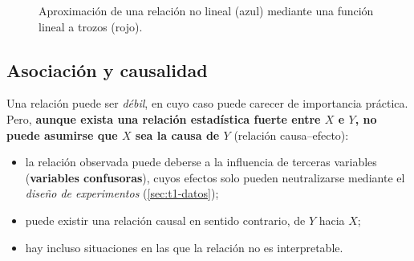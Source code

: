 \begin{figure}[H]
  \centering
  \caption{Aproximación de una relación no lineal (azul) mediante una función lineal a
    trozos (rojo).}
\end{figure}

\subsection{Asociación y causalidad}
\label{sec:t1-causalidad}

Una relación puede ser \emph{débil}, en cuyo caso puede carecer de importancia práctica. Pero,
\textbf{aunque exista una relación estadística fuerte entre $X$ e $Y$, no puede asumirse que
$X$ sea la causa de $Y$} (relación causa--efecto):
\begin{itemize}
  \item la relación observada puede deberse a la influencia de terceras variables
    (\textbf{variables confusoras}), cuyos efectos solo pueden neutralizarse mediante el
    \emph{diseño de experimentos} (\cref{sec:t1-datos});
  \item puede existir una relación causal en sentido contrario, de $Y$ hacia $X$;
  \item hay incluso situaciones en las que la relación no es interpretable.
\end{itemize}

